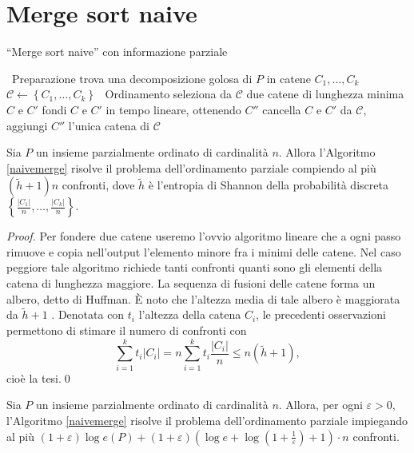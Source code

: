 \section{Merge sort naive} 
\begin{algorithm}
  \caption{``Merge sort naive'' con informazione parziale} \label{naivemerge} 
  \begin{algorithmic}
    [1] \STATE \, \COMMENT Preparazione \STATE trova una decomposizione golosa di \(P\) in catene \(C_1,\dots,C_k\) \STATE \(\mathcal{C}\leftarrow\left\{C_1,\dots,C_k\right\}\) \STATE \, \COMMENT Ordinamento  \STATE seleziona da \(\mathcal{C}\) due catene di lunghezza minima \(C\) e \(C'\) \STATE fondi \(C\) e \(C'\) in tempo lineare, ottenendo \(C''\) \STATE cancella \(C\) e \(C'\) da \(\mathcal{C}\), aggiungi \(C''\) \ENDWHILE \RETURN l'unica catena di \(\mathcal{C}\) 
  \end{algorithmic}
\end{algorithm}
\begin{lemma}
  \label{naivemergelemma} Sia \(P\) un insieme parzialmente ordinato di cardinalità \(n\). Allora l'Algoritmo \ref{naivemerge} risolve il problema dell'ordinamento parziale compiendo al più \((\tilde{h}+1)n\) confronti, dove \(\tilde{h}\) è l'entropia di Shannon della probabilità discreta \(\left\{\frac{|C_1|}{n},\dots,\frac{|C_k|}{n}\right\}\). 
\end{lemma}
\begin{proof}
  Per fondere due catene useremo l'ovvio algoritmo lineare che a ogni passo rimuove e copia nell'output l'elemento minore fra i minimi delle catene. Nel caso peggiore tale algoritmo richiede tanti confronti quanti sono gli elementi della catena di lunghezza maggiore. La sequenza di fusioni delle catene forma un albero, detto di Huffman. È noto che l'altezza media di tale albero è maggiorata da \(\tilde{h}+1\) \cite{Cover2006}. Denotata con \(t_i\) l'altezza della catena \(C_i\), le precedenti osservazioni permettono di stimare il numero di confronti con
  \[\sum_{i=1}^{k}{t_i|C_i|}=n\sum_{i=1}^{k}{t_i\frac{|C_i|}{n}}\le n(\tilde{h}+1),\]
  cioè la tesi.\qed 
\end{proof}
\begin{theorem}
  \label{naivemergetheorem} Sia \(P\) un insieme parzialmente ordinato di cardinalità \(n\). Allora, per ogni \(\varepsilon>0\), l'Algoritmo \ref{naivemerge} risolve il problema dell'ordinamento parziale impiegando al più \((1+\varepsilon)\log{e(P)}+(1+\varepsilon)\left(\log{e}+\log{\left(1+\frac{1}{\varepsilon}\right)}+1\right)\cdot n\) confronti. 
\end{theorem}
